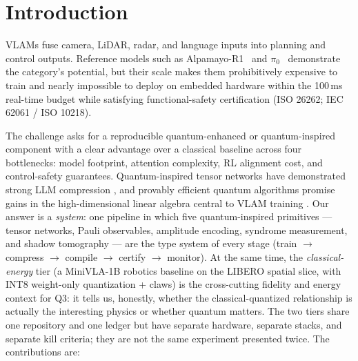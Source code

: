 \documentclass[conference,10pt]{IEEEtran}
\begin{document}
\section{Introduction}

VLAMs fuse camera, LiDAR, radar, and language inputs into planning and control
outputs. Reference models such as Alpamayo-R1~\cite{alpamayo} and
$\pi_0$~\cite{pi0} demonstrate the category's potential, but their scale makes
them prohibitively expensive to train and nearly impossible to deploy on
embedded hardware within the 100\,ms real-time budget while satisfying
functional-safety certification (ISO 26262; IEC 62061 / ISO 10218).

The challenge asks for a reproducible quantum-enhanced or quantum-inspired
component with a clear advantage over a classical baseline across four
bottlenecks: model footprint, attention complexity, RL alignment cost, and
control-safety guarantees. Quantum-inspired tensor networks have demonstrated
strong LLM compression \cite{compactifai}, and provably efficient quantum
algorithms promise gains in the high-dimensional linear algebra central to VLAM
training \cite{liu}. Our answer is a \emph{system}: one pipeline in which
five quantum-inspired primitives --- tensor networks, Pauli observables,
amplitude encoding, syndrome measurement, and shadow tomography --- are the
type system of every stage (train $\rightarrow$ compress $\rightarrow$ compile
$\rightarrow$ certify $\rightarrow$ monitor). At the same time, the
\emph{classical-energy} tier (a MiniVLA-1B robotics baseline on the LIBERO
spatial slice, with INT8 weight-only quantization + claws) is the
cross-cutting fidelity and energy context for Q3: it tells us, honestly,
whether the classical-quantized relationship is actually the interesting
physics or whether quantum matters. The two tiers share one repository and one
ledger but have separate hardware, separate stacks, and separate kill
criteria; they are not the same experiment presented twice. The contributions are:
\end{document}
